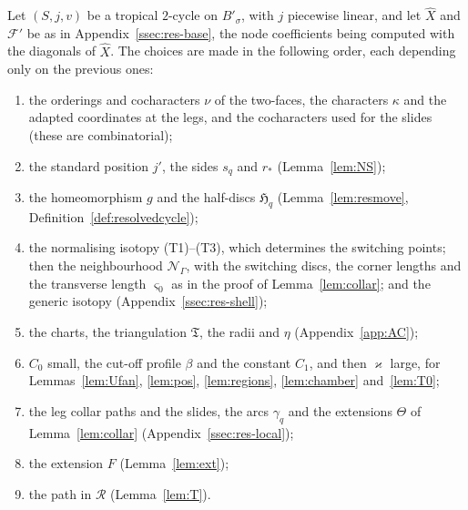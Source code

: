 Let $(S,j,v)$ be a tropical $2$-cycle on $B'_\sigma$, with $j$ piecewise linear, and let $\widehat X$ and $\mathcal F'$ be as in
Appendix~\ref{ssec:res-base}, the node coefficients being computed with the diagonals of $\widehat X$. The choices are made in the
following order, each depending only on the previous ones:
\begin{enumerate}
\item the orderings and cocharacters $\nu$ of the two-faces, the characters $\kappa$ and the adapted coordinates at the legs,
and the cocharacters used for the slides (these are combinatorial);
\item the standard position $j'$, the sides $s_q$ and $r_*$ (Lemma~\ref{lem:NS});
\item the homeomorphism $g$ and the half-discs $\mathfrak H_q$ (Lemma~\ref{lem:resmove}, Definition~\ref{def:resolvedcycle});
\item the normalising isotopy (T1)--(T3), which determines the switching points; then the neighbourhood $\mathcal N_\Gamma$,
with the switching discs, the corner lengths and the transverse length $\varsigma_0$ as in the proof of Lemma~\ref{lem:collar};
and the generic isotopy (Appendix~\ref{ssec:res-shell});
\item the charts, the triangulation $\mathfrak T$, the radii and $\eta$ (Appendix~\ref{app:AC});
\item $C_0$ small, the cut-off profile $\beta$ and the constant $C_1$, and then $\varkappa$ large, for Lemmas~\ref{lem:Ufan},
\ref{lem:pos}, \ref{lem:regions}, \ref{lem:chamber} and~\ref{lem:T0};
\item the leg collar paths and the slides, the arcs $\gamma_q$ and the extensions $\Theta$ of Lemma~\ref{lem:collar}
(Appendix~\ref{ssec:res-local});
\item the extension $F$ (Lemma~\ref{lem:ext});
\item the path in $\mathcal R$ (Lemma~\ref{lem:T}).
\end{enumerate}

